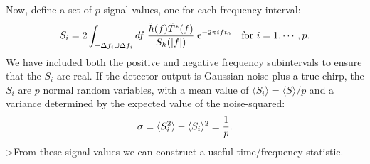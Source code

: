 Now, define a set of $p$ signal values, one for each frequency interval:
\begin{equation}
S_i = 2 \int_{-\Delta f_i \cup \Delta f_i} df \; { \tilde h(f)
\tilde T^* (f) \over S_h(|f|)}
 \; {\rm e}^{- 2 \pi i f t_0} \quad {\rm for\ } i=1,\cdots,p.
\end{equation}
We have included both the positive and negative frequency subintervals
to ensure that the $S_i$ are real. If the detector output is Gaussian
noise plus a true chirp, the $S_i$ are $p$ normal random variables,
with a mean value of $\langle S_i \rangle =\langle S \rangle /p$ and a
variance determined by the expected value of the noise-squared:
\begin{equation}
\sigma = \langle S_i^2 \rangle - \langle S_i \rangle^2 = {1 \over p}.
\end{equation} 
>From these signal values we can construct a useful time/frequency statistic.

